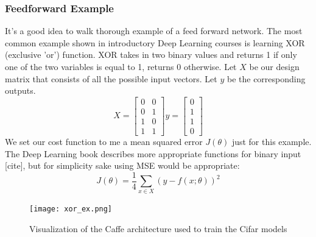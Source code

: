 \documentclass[paper=a4, fontsize=11pt]{scrartcl}
\numberwithin{equation}{section}		%
\numberwithin{figure}{section}			%
\numberwithin{table}{section}			%
\begin{document}
	\subsubsection{Feedforward Example}
	It's a good idea to walk thorough example of a feed forward network. The most common example shown in introductory Deep Learning courses is learning XOR (exclusive 'or') function. XOR takes in two binary values and returns 1 if only one of the two variables is equal to 1, returns 0 otherwise. 
	Let $X$ be our design matrix that consists of all the possible input vectors. Let $y$ be the corresponding outputs. 
		$$ X = 
		\begin{bmatrix}
			0 & 0 \\
			0 & 1 \\
			1 & 0 \\
			1 & 1
		\end{bmatrix} 
		y = 
		\begin{bmatrix}
		0 \\
		1 \\
		1 \\
		0 
		\end{bmatrix}$$
	We set our cost function to me a mean squared error $J(\theta)$ just for this example. The Deep Learning book describes more appropriate functions for binary input [cite], but for simplicity sake using MSE would be appropriate:
		$$ J(\theta)=\frac{1}{4}\sum_{x\in X}^{}(y-f(x;\theta))^2 $$
	
	\begin{figure}[!htb]
		\centering
		\texttt{[image: xor\_ex.png]}
		\caption{Visualization of the Caffe architecture used to train the Cifar models}
		\label{fig:cifar}
	\end{figure}
	
	
	
\end{document}
